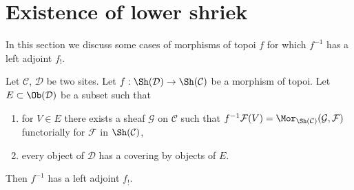 \section{Existence of lower shriek}
\label{section-lower-shriek}

\noindent
In this section we discuss some cases of morphisms of topoi $f$ for which
$f^{-1}$ has a left adjoint $f_!$.

\begin{lemma}
\label{lemma-existence-lower-shriek}
Let $\mathcal{C}$, $\mathcal{D}$ be two sites.
Let $f : \Sh(\mathcal{D}) \to \Sh(\mathcal{C})$ be a morphism of topoi.
Let $E \subset \Ob(\mathcal{D})$ be a subset such that
\begin{enumerate}
\item for $V \in E$ there exists a sheaf $\mathcal{G}$
on $\mathcal{C}$ such that $f^{-1}\mathcal{F}(V) = 
\Mor_{\Sh(\mathcal{C})}(\mathcal{G}, \mathcal{F})$ functorially
for $\mathcal{F}$ in $\Sh(\mathcal{C})$,
\item every object of $\mathcal{D}$ has a covering by objects of $E$.
\end{enumerate}
Then $f^{-1}$ has a left adjoint $f_!$.
\end{lemma}

